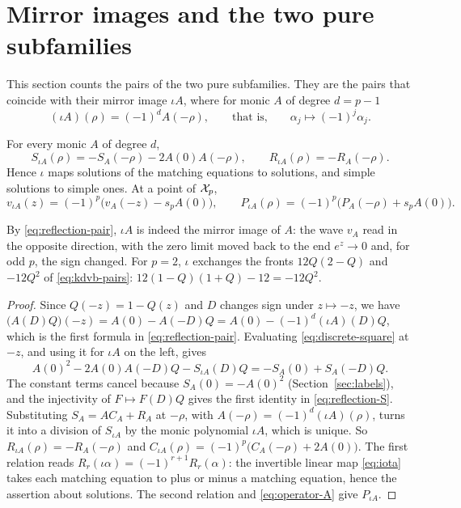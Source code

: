\section{Mirror images and the two pure subfamilies}\label{sec:reflection}

This section counts the pairs of the two pure subfamilies. They are the
pairs that coincide with their mirror image \(\iota A\), where for monic
\(A\) of degree \(d=p-1\)
\begin{equation}\label{eq:iota}
 (\iota A)(\rho)=(-1)^dA(-\rho),\qquad\text{that is,}\qquad
 \alpha_j\longmapsto(-1)^j\alpha_j .
\end{equation}

\begin{proposition}[Reflection]\label{prop:reflection}
For every monic \(A\) of degree \(d\),
\begin{equation}\label{eq:reflection-S}
 S_{\iota A}(\rho)=-S_A(-\rho)-2A(0)A(-\rho),\qquad
 R_{\iota A}(\rho)=-R_A(-\rho).
\end{equation}
Hence \(\iota\) maps solutions of the matching equations to solutions,
and simple solutions to simple ones. At a point of \(\mathcal X_p\),
\begin{equation}\label{eq:reflection-pair}
 v_{\iota A}(z)=(-1)^p\bigl(v_A(-z)-s_pA(0)\bigr),\qquad
 P_{\iota A}(\rho)=(-1)^p\bigl(P_A(-\rho)+s_pA(0)\bigr).
\end{equation}
\end{proposition}

By \eqref{eq:reflection-pair}, \(\iota A\) is indeed the mirror image of
\(A\): the wave \(v_A\) read in the opposite direction, with the zero
limit moved back to the end \(e^z\to0\) and, for odd \(p\), the sign
changed. For \(p=2\), \(\iota\) exchanges the fronts \(12Q(2-Q)\) and
\(-12Q^2\) of \eqref{eq:kdvb-pairs}: \(12(1-Q)(1+Q)-12=-12Q^2\).

\begin{proof}
Since \(Q(-z)=1-Q(z)\) and \(D\) changes sign under \(z\mapsto-z\), we
have \(\bigl(A(D)Q\bigr)(-z)=A(0)-A(-D)Q=A(0)-(-1)^d(\iota A)(D)Q\),
which is the first formula in \eqref{eq:reflection-pair}. Evaluating
\eqref{eq:discrete-square} at \(-z\), and using it for \(\iota A\) on
the left, gives
\[
 A(0)^2-2A(0)A(-D)Q-S_{\iota A}(D)Q=-S_A(0)+S_A(-D)Q .
\]
The constant terms cancel because \(S_A(0)=-A(0)^2\)
(Section~\ref{sec:labels}), and the injectivity of \(F\mapsto F(D)Q\)
gives the first identity in \eqref{eq:reflection-S}. Substituting
\(S_A=AC_A+R_A\) at \(-\rho\), with \(A(-\rho)=(-1)^d(\iota A)(\rho)\),
turns it into a division of \(S_{\iota A}\) by the monic polynomial
\(\iota A\), which is unique. So \(R_{\iota A}(\rho)=-R_A(-\rho)\) and
\(C_{\iota A}(\rho)=(-1)^p\bigl(C_A(-\rho)+2A(0)\bigr)\). The first
relation reads \(R_r(\iota\alpha)=(-1)^{r+1}R_r(\alpha)\): the
invertible linear map \eqref{eq:iota} takes each matching equation to
plus or minus a matching equation, hence the assertion about solutions.
The second relation and \eqref{eq:operator-A} give \(P_{\iota A}\).
\end{proof}

